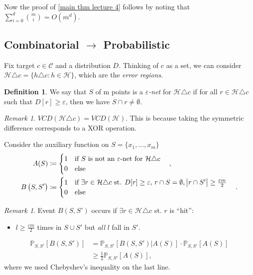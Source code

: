 \documentclass[12pt, letterpaper]{article}
\numberwithin{equation}{section} %
\newcommand{\mb}{\mathbb}
\newcommand{\mc}{\mathcal}
\newcommand{\ve}{\varepsilon}
\theoremstyle{definition}
\newtheorem{definition}[theorem]{Definition}
\theoremstyle{remark}
\newtheorem{remark}[theorem]{Remark}
\begin{document}
Now the proof of \cref{main thm lecture 4} follows by noting that $\sum\limits_{i=0}^d\binom{m}{i} = O(m^d)$.

\subsection{Combinatorial $\rightarrow$ Probabilistic}
Fix target $c\in\mc C$ and a distribution $D$. Thinking of $c$ as a set, we can consider $\mc H\triangle c = \lbrace h\triangle c : h\in\mc H \rbrace$, which are the \emph{error regions}.
\begin{definition}
 We say that $S$ of m points is a \emph{$\ve$-net} for $\mc H\triangle c$ if for all $r\in\mc H\triangle c$ such that $D[r]\geq \ve$, then we have $S\cap r \ne \emptyset$.
\end{definition}
\begin{remark}
$VCD(\mc H\triangle c) = VCD(\mc H)$. This is because taking the symmetric difference corresponds to a XOR operation.
\end{remark}
Consider the auxiliary function on $S = \lbrace x_1,\ldots,x_m\rbrace$
\begin{align}
    A(S)&\coloneqq
    \begin{cases}
    1\quad\textrm{if $S$ is not an $\ve$-net for $\mc H\triangle c$}\\
    0\quad\textrm{else}
    \end{cases},\\
    B\left(S, S'\right)&\coloneqq
    \begin{cases}
    1\quad\textrm{if $\exists r \in \mc H\triangle c$ st. $D[r]\geq\ve$, $r\cap S=\emptyset$, $\abs{r\cap S'}\geq \frac{\ve m}2$}\\
    0\quad\textrm{else}
    \end{cases}.
\end{align}
\begin{remark}
    Event $B\left(S, S'\right)$ occurs if $\exists r \in \mc H\triangle c$ st. $r$ is ``hit'':
    \begin{itemize}
    \item $l \geq \frac{\ve m}2$ times in $S\cup S'$ but \emph{all} $l$ fall in $S'$.
    \end{itemize}
\end{remark}
\begin{align}
    \mb P_{S, S'}[B(S, S')] &= \mb P_{S, S'}[ B(S, S') \left|\right. A(S)] \cdot  \mb P_{S, S'}[A(S)]\\
    &\geq \frac12  \mb P_{S, S'}[A(S)],
\end{align}
where we used Chebyshev's inequality on the last line.
\end{document}
